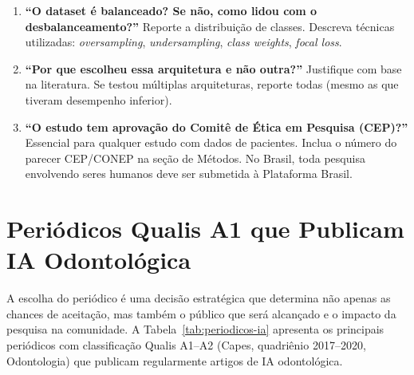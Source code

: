 \begin{enumerate}
  \item \textbf{``O dataset é balanceado? Se não, como lidou com o
    desbalanceamento?''}
    Reporte a distribuição de classes. Descreva técnicas utilizadas:
    \textit{oversampling}, \textit{undersampling}, \textit{class weights},
    \textit{focal loss}.

  \item \textbf{``Por que escolheu essa arquitetura e não outra?''}
    Justifique com base na literatura. Se testou múltiplas arquiteturas, reporte
    todas (mesmo as que tiveram desempenho inferior).

  \item \textbf{``O estudo tem aprovação do Comitê de Ética em Pesquisa (CEP)?''}
    Essencial para qualquer estudo com dados de pacientes. Inclua o número do
    parecer CEP/CONEP na seção de Métodos. No Brasil, toda pesquisa envolvendo
    seres humanos deve ser submetida à Plataforma Brasil.
\end{enumerate}


\section{Periódicos Qualis A1 que Publicam IA Odontológica}
\label{sec:periodicos-qualis}

\nivelquatro

A escolha do periódico é uma decisão estratégica que determina não apenas as
chances de aceitação, mas também o público que será alcançado e o impacto da
pesquisa na comunidade. A Tabela~\ref{tab:periodicos-ia} apresenta os principais
periódicos com classificação Qualis A1--A2 (Capes, quadriênio 2017--2020,
Odontologia) que publicam regularmente artigos de IA odontológica.

 

